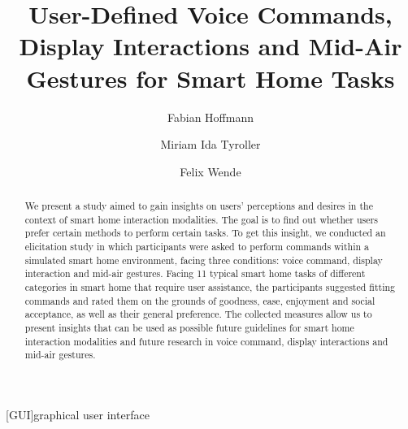 \documentclass[sigchi]{acmart}
\begin{document}
	\begin{acronym}
	[GUI]{graphical user interface}
	\end{acronym}
	
	\title{User-Defined Voice Commands, Display Interactions and Mid-Air Gestures for Smart Home Tasks}
	
	\author{Fabian Hoffmann}
	
	\author{Miriam Ida Tyroller}
	
	\author{Felix Wende}
	
	
	\begin{abstract}
		We present a study aimed to gain insights on users' perceptions and desires in the context of smart home interaction modalities. The goal is to find out whether users prefer certain methods to perform certain tasks. To get this insight, we conducted an elicitation study in which participants were asked to perform commands within a simulated smart home environment, facing three conditions: voice command, display interaction and mid-air gestures. Facing 11 typical smart home tasks of different categories in smart home that require user assistance, the participants suggested fitting commands and rated them on the grounds of goodness, ease, enjoyment and social acceptance, as well as their general preference. The collected measures allow us to present insights that can be used as possible future guidelines for smart home interaction modalities and future research in voice command, display interactions and mid-air gestures.
	\end{abstract}
	
\end{document}
